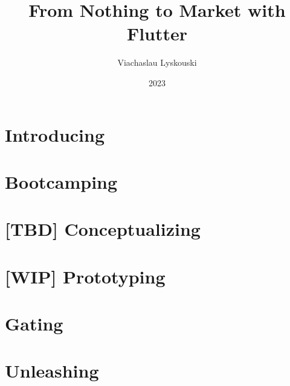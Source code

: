 \documentclass[12pt, a4paper, twoside]{extreport}
\author{Viachaslau Lyskouski}
\title{From Nothing to Market with Flutter}
\date{2023}
\begin{document}


\maketitle

%

\tableofcontents



\newpage
\section*{Introducing}


\newpage
\section{Bootcamping}



\newpage
\section{[TBD] Conceptualizing}


\newpage
\section{[WIP] Prototyping}


\newpage





\newpage
\section{Gating}







\newpage
\section{Unleashing}






\end{document}

